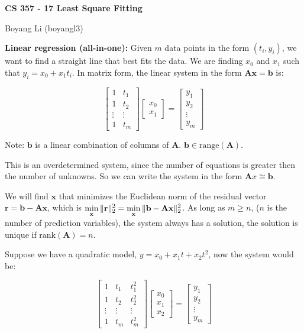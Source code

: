 \documentclass[12pt]{article}
\begin{document}
\begin{center}\Large\bf 
CS 357 - 17 Least Square Fitting\\
\end{center}
\begin{center}
Boyang Li (boyangl3)
\end{center}

\medskip
\noindent \textbf{Linear regression (all-in-one):} Given $m$ data points in the form $(t_i, y_i)$, we want to find a straight line that best fits the data. We are finding $x_0$ and $x_1$ such that $y_i = x_0 + x_1t_i$. In matrix form, the linear system in the form $\mathbf{Ax} = \mathbf{b}$ is:

$$\begin{bmatrix} 1 & t_1 \\ 1& t_2 \\ \vdots & \vdots\\ 1& t_m \end{bmatrix} \begin{bmatrix} x_0\\ x_1 \end{bmatrix} = \begin{bmatrix} y_1\\ y_2\\ \vdots\\ y_m \end{bmatrix}$$

Note: $\mathbf{b}$ is a linear combination of columns of $\mathbf{A}$. $\mathbf{b} \in \text{range}(\mathbf{A})$.

This is an overdetermined system, since the number of equations is greater then the number of unknowns. So we can write the system in the form ${\mathbf A x} \cong {\mathbf b}$.

We will find $\mathbf{x}$ that minimizes the Euclidean norm of the residual vector $\mathbf{r} = \mathbf{b} - \mathbf{Ax}$, which is $\displaystyle \min_{ {\bf x} } \|{\bf r}\|_2^2 = \min_{ {\bf x} } \|{\bf b} - {\bf A} {\bf x}\|_2^2$. As long as ${m \ge n}$, ($n$ is the number of prediction variables), the system always has a solution, the solution is unique if ${\text{rank}(\mathbf A)= n}$.

Suppose we have a quadratic model, $y = x_0 + x_1 t + x_2 t^2$, now the system would be:
    
$$\begin{bmatrix} 1 & t_1 & t_1^2 \\ 1& t_2 & t_2^2\\ \vdots & \vdots & \vdots \\ 1& t_m &t_m^2 \end{bmatrix} \begin{bmatrix} x_0\\ x_1 \\ x_2 \end{bmatrix} = \begin{bmatrix} y_1\\ y_2\\ \vdots\\ y_m \end{bmatrix}$$
\end{document}

